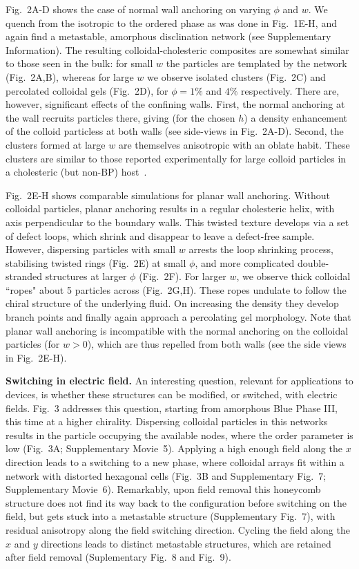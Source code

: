 \documentclass[12pt]{article}
\begin{document}
Fig.~2A-D shows the case of normal wall anchoring on varying $\phi$ and $w$. We quench from the isotropic to the ordered phase as was done in Fig.~1E-H, and again find a metastable, amorphous disclination network (see Supplementary Information). The resulting colloidal-cholesteric composites are somewhat similar to those seen in the bulk: for small $w$ the particles are templated by the network (Fig.~2A,B), whereas for large $w$ we observe isolated clusters (Fig.~2C) and percolated colloidal gels (Fig.~2D), for $\phi = 1\%$ and $4\%$ respectively. There are, however, significant effects of the confining walls.
First, the normal anchoring at the wall recruits particles there,  giving (for the chosen $h$) a density enhancement of the colloid particless at both walls 
(see side-views in Fig.~2A-D). Second, the clusters formed at large $w$ are themselves anisotropic with an oblate habit. These clusters
are similar to those reported experimentally for large colloid particles in a
cholesteric (but non-BP) host~\cite{niek}.
 
Fig.~2E-H shows comparable simulations for planar wall anchoring. 
Without colloidal particles, planar anchoring results in a regular
cholesteric helix,
with axis perpendicular to the boundary walls. 
This twisted texture develops via a set of defect loops,
which shrink and disappear to leave a defect-free sample. However,
dispersing particles with small $w$ arrests the loop shrinking process,
stabilising twisted rings (Fig.~2E) at small $\phi$, and more complicated 
double-stranded structures at larger $\phi$ (Fig.~2F).
For larger $w$, we observe thick colloidal ``ropes" about 5 particles across
(Fig.~2G,H). These ropes undulate to follow the chiral structure of the 
underlying fluid. On increasing the density they develop branch points and finally again approach a percolating gel morphology. Note that planar wall anchoring is incompatible with the normal anchoring on the colloidal particles (for $w>0$), which are thus repelled from both walls (see the side views in Fig.~2E-H).

\medskip
\noindent
\textbf{Switching in electric field.}
An interesting question, relevant for applications to devices, is whether 
these structures can be modified, or switched, with electric fields.
Fig.~3 addresses this question, starting from amorphous Blue Phase III,
this time at a higher chirality. Dispersing colloidal particles in this networks
results in the particle occupying the available nodes, where the order
parameter is low (Fig.~3A; Supplementary Movie~5). Applying a high enough
field 
along the $x$ direction leads to a switching to a new phase, where colloidal 
arrays fit within a network with distorted hexagonal cells (Fig.~3B 
and Supplementary Fig.~7; Supplementary Movie~6). 
Remarkably, upon field removal this honeycomb structure does not find its 
way back to the 
configuration before switching on the field, but gets stuck into a metastable 
structure (Supplementary Fig.~7), with residual anisotropy along the field
switching 
direction. Cycling the field along the $x$ and $y$ directions leads to
distinct metastable structures, which are retained after field removal
(Suplementary Fig.~8 and Fig.~9).
\end{document}
